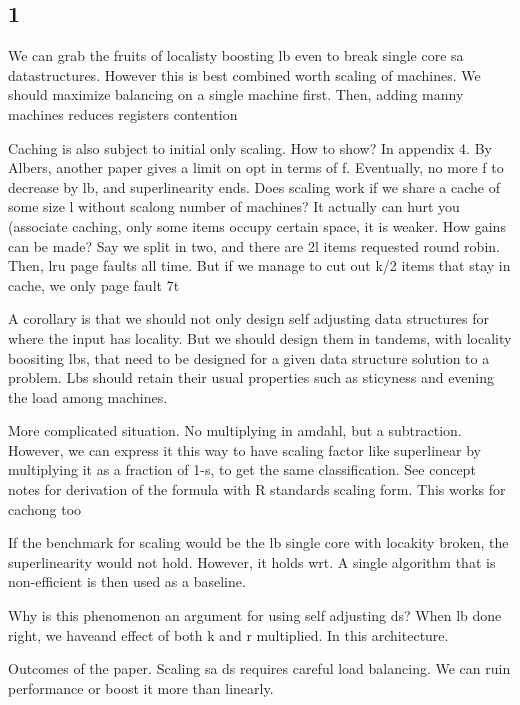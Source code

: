 \subsection{1}


We can grab the fruits of localisty boosting lb even to break single core sa datastructures. However  this is best combined worth scaling of machines. We should maximize balancing on a single machine first. Then, adding manny machines reduces registers contention




Caching is also subject to initial only scaling. How to show? In appendix 4. By Albers, another paper gives a limit on opt in terms of f. Eventually, no more f to decrease by lb, and superlinearity ends. Does scaling work if we share a cache of some size l without scalong number of machines? It actually can hurt you (associate caching, only some items occupy certain space, it is weaker. How gains can be made? Say we split in two, and there are 2l items requested round robin. Then, lru page faults all time. But if we manage to cut out k/2 items that stay in cache, we only page fault 7t%


A corollary is that we should not only design self adjusting data structures for where the input has locality. But we should design them in tandems, with locality boositing lbs, that need to be designed for a given data structure solution to a problem. Lbs should retain their usual properties such as sticyness and evening the load among machines.

More complicated situation. No multiplying in amdahl, but a subtraction. However, we can express it this way to have scaling factor like superlinear by multiplying it as a fraction of 1-s, to get the same classification. See concept notes for derivation of the formula with R standards scaling form. This works for cachong too


If the benchmark for scaling would be the lb single core with locakity broken, the superlinearity would not hold. However, it holds wrt. A single algorithm that is non-efficient is then used as a baseline.




Why is this phenomenon an argument for using self adjusting ds? When lb done right, we haveand effect of both k and r multiplied. In this architecture.

Outcomes of the paper. Scaling sa ds requires careful load balancing. We can ruin performance or boost it more than linearly.

